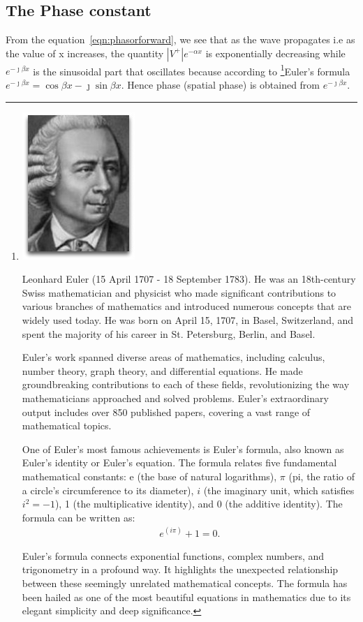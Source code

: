 \subsection{The Phase constant}
From the equation~\eqref{eqn:phasorforward}, we see that as the wave propagates i.e as the value of x increases, the quantity $\left|V^+\right|e^{-\alpha x}$ is exponentially decreasing while $e^{-\jmath\beta x}$ is the sinusoidal part that oscillates because according to \footnote{
\includegraphics[scale=0.2]{graphics/euler}

Leonhard Euler (15 April 1707 - 18 September 1783). He was an 18th-century Swiss mathematician and physicist who made significant contributions to various branches of mathematics and introduced numerous concepts that are widely used today. He was born on April 15, 1707, in Basel, Switzerland, and spent the majority of his career in St. Petersburg, Berlin, and Basel.

Euler's work spanned diverse areas of mathematics, including calculus, number theory, graph theory, and differential equations. He made groundbreaking contributions to each of these fields, revolutionizing the way mathematicians approached and solved problems. Euler's extraordinary output includes over 850 published papers, covering a vast range of mathematical topics.

One of Euler's most famous achievements is Euler's formula, also known as Euler's identity or Euler's equation. The formula relates five fundamental mathematical constants: e (the base of natural logarithms), $\pi$ (pi, the ratio of a circle's circumference to its diameter), $i$ (the imaginary unit, which satisfies $i^2 = -1$), 1 (the multiplicative identity), and 0 (the additive identity). The formula can be written as:
\begin{align*}
e^(i\pi) + 1 = 0.
\end{align*}

Euler's formula connects exponential functions, complex numbers, and trigonometry in a profound way. It highlights the unexpected relationship between these seemingly unrelated mathematical concepts. The formula has been hailed as one of the most beautiful equations in mathematics due to its elegant simplicity and deep significance.
}Euler's formula $e^{-\jmath\beta x} = \cos{\beta x} - \jmath \sin{ \beta x}$. Hence phase (spatial phase) is obtained from $e^{-\jmath\beta x}$.

